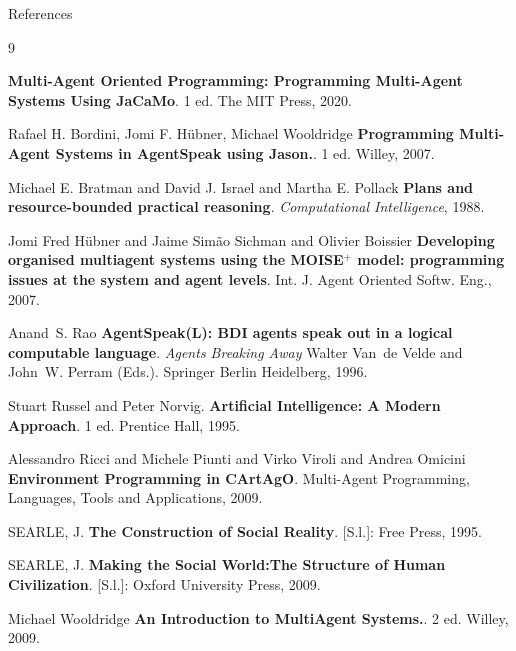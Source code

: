 \documentclass[compress]{beamer}
\begin{document}
\begin{frame}[allowframebreaks=0.95]{References}

\begin{scriptsize}

\begin{thebibliography}{9}


\newblock \textbf{Multi-Agent Oriented Programming: Programming Multi-Agent Systems Using JaCaMo}. 1 ed. The MIT Press, 2020.


Rafael H. Bordini, Jomi F. H\"{u}bner, Michael Wooldridge
\newblock \textbf{Programming Multi-Agent Systems in AgentSpeak using Jason.}. 1 ed. Willey, 2007.

Michael E. Bratman and David J. Israel and Martha E. Pollack
\newblock
\textbf{Plans and resource-bounded practical reasoning}. \textit{Computational Intelligence},  1988.


Jomi Fred H{\"{u}}bner and Jaime Sim{\~{a}}o Sichman and Olivier Boissier
\newblock \textbf{Developing organised multiagent systems using the MOISE\({}^{\mbox{+}}\)
                  model: programming issues at the system and agent levels}. 
Int. J. Agent Oriented Softw. Eng., 2007.

Anand~S. Rao
\newblock
\textbf{AgentSpeak(L): BDI agents speak out in a logical
  computable language}. \textit{Agents Breaking Away} Walter Van~de Velde and John~W. Perram (Eds.). Springer Berlin Heidelberg, 1996.

Stuart Russel and Peter Norvig.
\newblock \textbf{Artificial Intelligence: A Modern Approach}. 1 ed. Prentice Hall, 1995.



Alessandro Ricci and Michele Piunti and Virko Viroli and Andrea Omicini
\newblock \textbf{Environment Programming in CArtAgO}. Multi-Agent Programming, Languages, Tools and Applications, 2009.


 
{SEARLE, J. \textbf{{The Construction of Social Reality}}. [S.l.]: Free Press,
  1995.}

{SEARLE, J. \textbf{{Making the Social World:The Structure of Human
  Civilization}}. [S.l.]: {Oxford University Press}, {2009}.}

Michael Wooldridge
\newblock \textbf{An Introduction to MultiAgent Systems.}. 2 ed. Willey, 2009.




  

  
\end{thebibliography}
\end{scriptsize}
\end{frame}


\end{document}
